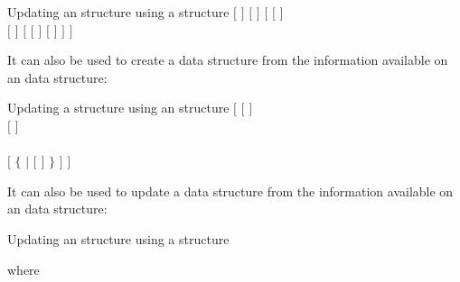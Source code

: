 \begin{DataStructure}{Updating an  structure using a  structure}\label{tab2}
  \moc{:=}    $[$  $]$  $[$  $]$ $[$ \moc{::} 
$[$  $]$ \\
\hspace*{1.0cm}  $[$   $]$ 
 $[$    $[$  $]$ $[$  
$]$  $]$   $]$ 
\end{DataStructure} It can also be used to create a  data structure from the information available on an  data structure:
\begin{DataStructure}{Updating a  structure using an  structure}
  \moc{:=}     $[$  \moc{::} $[$  $]$ \\
\hspace*{1.0cm} $[$   $]$\\
\hspace*{1.0cm}    \\
\hspace*{1.0cm} $[$  
   $\{$      
  $|$ $[$  $]$   $\}$
$]$ $]$   
\end{DataStructure}
\noindent  It can also be used to update a  data structure from the information available on an  data structure:
\begin{DataStructure}{Updating an  structure using a  structure}
  \moc{:=}       
\end{DataStructure}

\noindent where

